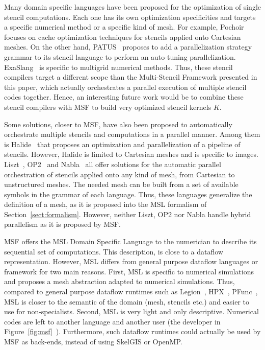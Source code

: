 Many domain specific languages have been proposed for the optimization of single stencil computations.
Each one has its own optimization specificities and targets a specific numerical method or a specific kind of mesh.
For example, Pochoir~\cite{spaaTangCKLL11} focuses on cache optimization techniques for stencils applied onto Cartesian meshes.
On the other hand, PATUS~\cite{citeulike12258902} proposes to add a parallelization strategy grammar to its stencil language to perform an auto-tuning parallelization. ExaSlang~\cite{Schmitt:2014:EDL:2691166.2691171} is specific to multigrid numerical methods. Thus, these stencil compilers target a different scope than the Multi-Stencil Framework presented in this paper, which actually orchestrates a parallel execution of multiple stencil codes together. Hence, an interesting future work would be to combine these stencil compilers with MSF to build very optimized stencil kernels $K$.

Some solutions, closer to MSF, have also been proposed to automatically orchestrate multiple stencils and computations in a parallel manner. Among them is Halide~\cite{Ragan-Kelley:2013:HLC:2491956.2462176} that proposes an optimization and parallelization of a pipeline of stencils. However, Halide is limited to Cartesian meshes and is specific to images. Liszt~\cite{DeVito:2011:LDS:2063384.2063396}, OP2~\cite{Giles2011} and Nabla~\cite{Camier:2015:IPP:2820083.2820107} all offer solutions for the automatic parallel orchestration of stencils applied onto any kind of mesh, from Cartesian to unstructured meshes. The needed mesh can be built from a set of available symbols in the grammar of each language. Thus, these languages generalize the definition of a mesh, as it is proposed into the MSL formalism of Section~\ref{sect:formalism}. However, neither Liszt, OP2 nor Nabla handle hybrid parallelism as it is proposed by MSF.

MSF offers the MSL Domain Specific Language to the numerician to describe its sequential set of computations. This description, is close to a dataflow representation. However, MSL differs from general purpose dataflow languages or framework for two main reasons. First, MSL is specific to numerical simulations and proposes a mesh abstraction adapted to numerical simulations. Thus, compared to general purpose dataflow runtimes such as Legion~\cite{bauer:legion:sc:2012}, HPX~\cite{Kaiser:2014:HTB:2676870.2676883}, PFunc~\cite{Kambadur:2009:PMT:1654059.1654103}, MSL is closer to the semantic of the domain (mesh, stencils etc.) and easier to use for non-specialists. Second, MSL is very light and only descriptive. Numerical codes are left to another language and another user (the developer in Figure~\ref{fig:msf}~). Furthermore, such dataflow runtimes could actually be used by MSF as back-ends, instead of using SkelGIS or OpenMP.

